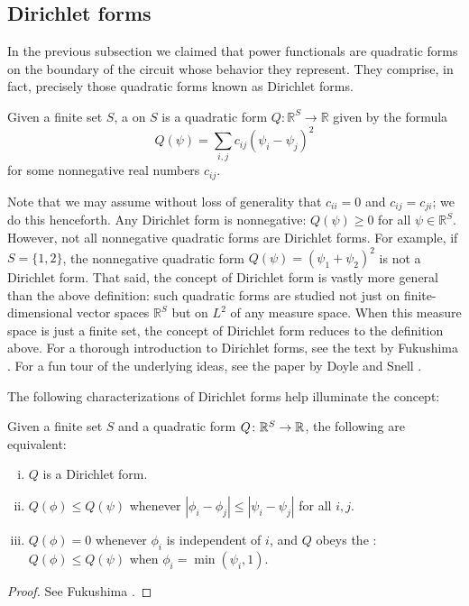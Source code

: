\subsection{Dirichlet forms}

In the previous subsection we claimed that power functionals are quadratic forms
on the boundary of the circuit whose behavior they represent. They comprise, in
fact, precisely those quadratic forms known as Dirichlet forms.

\begin{definition}
Given a finite set $S$, a  on $S$ is a quadratic form $Q:
\mathbb{R}^S \to \mathbb{R}$ given by the formula
\[
  Q(\psi) = \sum_{i,j} c_{i j} (\psi_i - \psi_j)^2
\]
for some nonnegative real numbers $c_{i j}$.  
\end{definition}

Note that we may assume without loss of generality that $c_{i i} = 0$ and $c_{i
j} = c_{j i}$; we do this henceforth.  Any Dirichlet form is nonnegative:
$Q(\psi) \ge 0$ for all $\psi \in \mathbb{R}^S$.  However, not all nonnegative
quadratic forms are Dirichlet forms.  For example, if $S = \{1, 2\}$, the
nonnegative quadratic form $Q(\psi) = (\psi_1 + \psi_2)^2$ is not a Dirichlet
form. That said, the concept of Dirichlet form is vastly more general than the
above definition: such quadratic forms are studied not just on
finite-dimensional vector spaces $\mathbb{R}^S$ but on $L^2$ of any measure
space.  When this measure space is just a finite set, the concept of Dirichlet
form reduces to the definition above.  For a thorough introduction to Dirichlet
forms, see the text by Fukushima \cite{Fukushima}.  For a fun tour of the
underlying ideas, see the paper by Doyle and Snell \cite{DS}. 

The following characterizations of Dirichlet forms help illuminate the concept:

\begin{proposition} \label{dirichlet_characterizations}
  Given a finite set $S$ and a quadratic form $Q{\colon} \mathbb{R}^S \to \mathbb{R}$,
  the following are equivalent:
  \begin{enumerate}[(i)]
    \item $Q$ is a Dirichlet form.

    \item $Q(\phi) \le Q(\psi)$ whenever $|\phi_i - \phi_j| \le |\psi_i -
      \psi_j|$ for all $i, j$. 

    \item $Q(\phi) = 0$ whenever $\phi_i$ is independent of $i$, and $Q$ obeys
      the : $Q(\phi) \le Q(\psi)$ when $\phi_i = \min
      (\psi_i, 1) $.
  \end{enumerate}
\end{proposition}
\begin{proof}
See Fukushima \cite{Fukushima}.
\end{proof}

